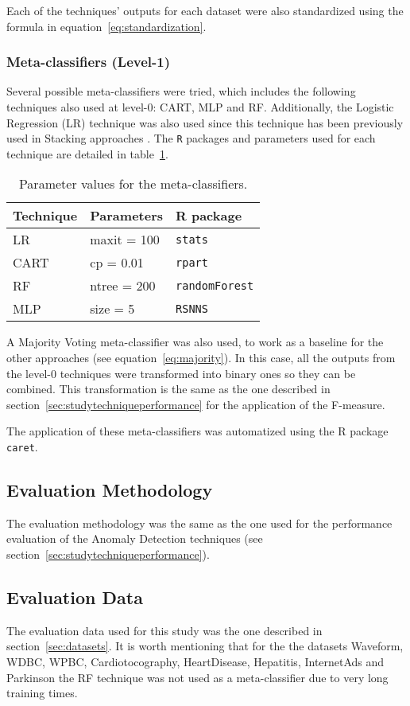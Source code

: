 Each of the techniques' outputs for each dataset were also standardized using the formula in equation~\ref{eq:standardization}.

\subsubsection{Meta-classifiers (Level-1)}

Several possible meta-classifiers were tried, which includes the following techniques also used at level-0: CART, MLP and RF.
Additionally, the Logistic Regression (LR) technique was also used since this technique has been previously used in Stacking approaches \cite{Sesmero2015}. The \verb|R| packages and parameters used for each technique are detailed in table~\ref{tab:meta_param}.

\begin{table}[!ht]
	\centering
	\caption{Parameter values for the meta-classifiers.}
	\label{tab:meta_param}
	\begin{tabular}{@{}lll@{}}
		\toprule
		\textbf{Technique} & \textbf{Parameters} & \textbf{R package} \\ \midrule
		LR & maxit = 100 & \verb|stats| \\
		CART & cp = 0.01 & \verb|rpart| \\
		RF & ntree = 200 & \verb|randomForest| \\
		MLP & size = 5 & \verb|RSNNS| \\
		\bottomrule
	\end{tabular}
\end{table}

A Majority Voting meta-classifier was also used, to work as a baseline for the other approaches (see equation~\ref{eq:majority}).
In this case, all the outputs from the level-0 techniques were transformed into binary ones so they can be combined.
This transformation is the same as the one described in section~\ref{sec:studytechniqueperformance} for the application of the F-measure.

The application of these meta-classifiers was automatized using the R package \verb|caret|.

\subsection{Evaluation Methodology}

The evaluation methodology was the same as the one used for the performance evaluation of the Anomaly Detection techniques (see section~\ref{sec:studytechniqueperformance}).

\subsection{Evaluation Data}

The evaluation data used for this study was the one described in section~\ref{sec:datasets}.
It is worth mentioning that for the the datasets Waveform, WDBC, WPBC, Cardiotocography, HeartDisease, Hepatitis, InternetAds and Parkinson the RF technique was not used as a meta-classifier due to very long training times.
